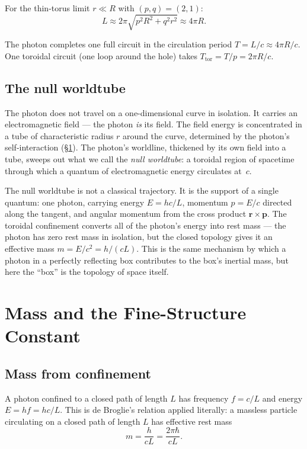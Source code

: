 \documentclass[11pt,a4paper]{article}
\begin{document}
For the thin-torus limit $r \ll R$ with $(p,q) = (2,1)$:
\begin{equation}
  L \approx 2\pi\sqrt{p^2 R^2 + q^2 r^2} \approx 4\pi R.
  \label{eq:path-thin}
\end{equation}

The photon completes one full circuit in the circulation period $T = L/c \approx 4\pi R/c$. One toroidal circuit (one loop around the hole) takes $T_{\text{tor}} = T/p = 2\pi R/c$.

\subsection{The null worldtube}

The photon does not travel on a one-dimensional curve in isolation. It carries an electromagnetic field --- the photon \emph{is} its field. The field energy is concentrated in a tube of characteristic radius $r$ around the curve, determined by the photon's self-interaction (\S\ref{sec:mass}). The photon's worldline, thickened by its own field into a tube, sweeps out what we call the \emph{null worldtube}: a toroidal region of spacetime through which a quantum of electromagnetic energy circulates at~$c$.

The null worldtube is not a classical trajectory. It is the support of a single quantum: one photon, carrying energy $E = hc/L$, momentum $p = E/c$ directed along the tangent, and angular momentum from the cross product $\mathbf{r} \times \mathbf{p}$. The toroidal confinement converts all of the photon's energy into rest mass --- the photon has zero rest mass in isolation, but the closed topology gives it an effective mass $m = E/c^2 = h/(cL)$. This is the same mechanism by which a photon in a perfectly reflecting box contributes to the box's inertial mass, but here the ``box'' is the topology of space itself.

\section{Mass and the Fine-Structure Constant}
\label{sec:mass}

\subsection{Mass from confinement}

A photon confined to a closed path of length $L$ has frequency $f = c/L$ and energy $E = hf = hc/L$. This is de Broglie's relation applied literally: a massless particle circulating on a closed path of length $L$ has effective rest mass
\begin{equation}
  m = \frac{h}{cL} = \frac{2\pi\hbar}{cL}.
  \label{eq:mass-confinement}
\end{equation}
\end{document}
